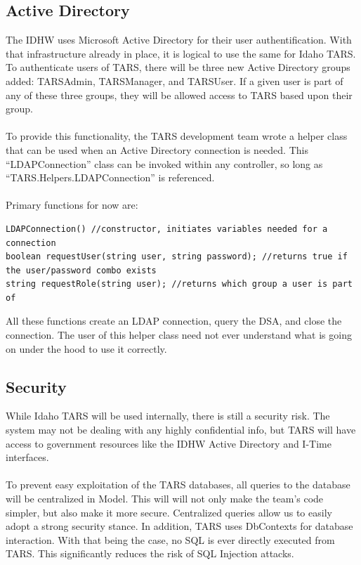 \documentclass[letterpaper]{article}
\begin{document}
\subsection{Active Directory}
The IDHW uses Microsoft Active Directory for their user authentification. With that infrastructure already in place, it is logical to use the same for Idaho TARS. To authenticate users of TARS, there will be three new Active Directory groups added: TARSAdmin, TARSManager, and TARSUser. If a given user is part of any of these three groups, they will be allowed access to TARS based upon their group. \\
\\
To provide this functionality, the TARS development team wrote a helper class that can be used when an Active Directory connection is needed. This ``LDAPConnection'' class can be invoked within any controller, so long as ``TARS.Helpers.LDAPConnection'' is referenced.\\
\\
Primary functions for now are:
\begin{verbatim}
LDAPConnection() //constructor, initiates variables needed for a connection
boolean requestUser(string user, string password); //returns true if the user/password combo exists
string requestRole(string user); //returns which group a user is part of
\end{verbatim}
All these functions create an LDAP connection, query the DSA, and close the connection. The user of this helper class need not ever understand what is going on under the hood to use it correctly. 

\subsection{Security}
While Idaho TARS will be used internally, there is still a security risk. The system may not be dealing with any highly confidential info, but TARS will have access to government resources like the IDHW Active Directory and I-Time interfaces.\\
\\
To prevent easy exploitation of the TARS databases, all queries to the database will be centralized in Model. This will will not only make the team's code simpler, but also make it more secure. Centralized queries allow us to easily adopt a strong security stance. In addition, TARS uses DbContexts for database interaction. With that being the case, no SQL is ever directly executed from TARS. This significantly reduces the risk of SQL Injection attacks.
\end{document}
